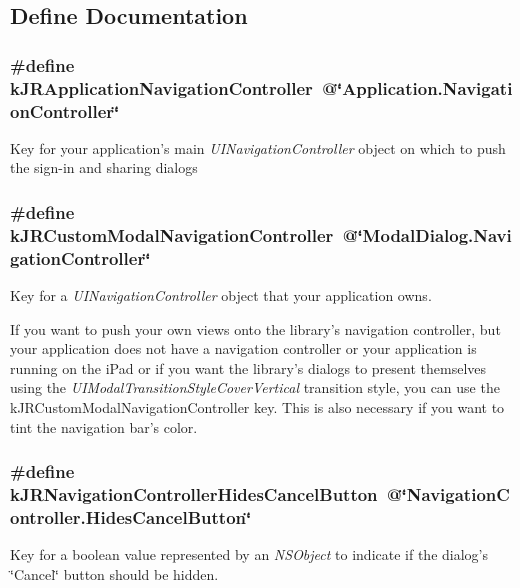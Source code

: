 \subsection{Define Documentation}
\hypertarget{group__custom_interface_ga7bace8001f549fc2ecbe84d967d24d22}{
\subsubsection[{kJRApplicationNavigationController}]{\setlength{\rightskip}{0pt plus 5cm}\#define kJRApplicationNavigationController~@\char`\"{}Application.NavigationController\char`\"{}}}
\label{group__custom_interface_ga7bace8001f549fc2ecbe84d967d24d22}
Key for your application's main {\itshape UINavigationController\/} object on which to push the sign-\/in and sharing dialogs \hypertarget{group__custom_interface_ga679ad3bb2027bd7411ab78498b35d1e5}{
\subsubsection[{kJRCustomModalNavigationController}]{\setlength{\rightskip}{0pt plus 5cm}\#define kJRCustomModalNavigationController~@\char`\"{}ModalDialog.NavigationController\char`\"{}}}
\label{group__custom_interface_ga679ad3bb2027bd7411ab78498b35d1e5}
Key for a {\itshape UINavigationController\/} object that your application owns.

If you want to push your own views onto the library’s navigation controller, but your application does not have a navigation controller or your application is running on the iPad or if you want the library’s dialogs to present themselves using the {\itshape UIModalTransitionStyleCoverVertical\/} transition style, you can use the kJRCustomModalNavigationController key. This is also necessary if you want to tint the navigation bar’s color. \hypertarget{group__custom_interface_ga5a178385f76a899dfddc8030238fb5e0}{
\subsubsection[{kJRNavigationControllerHidesCancelButton}]{\setlength{\rightskip}{0pt plus 5cm}\#define kJRNavigationControllerHidesCancelButton~@\char`\"{}NavigationController.HidesCancelButton\char`\"{}}}
\label{group__custom_interface_ga5a178385f76a899dfddc8030238fb5e0}
Key for a boolean value represented by an {\itshape NSObject\/} to indicate if the dialog's \char`\"{}Cancel\char`\"{} button should be hidden.

